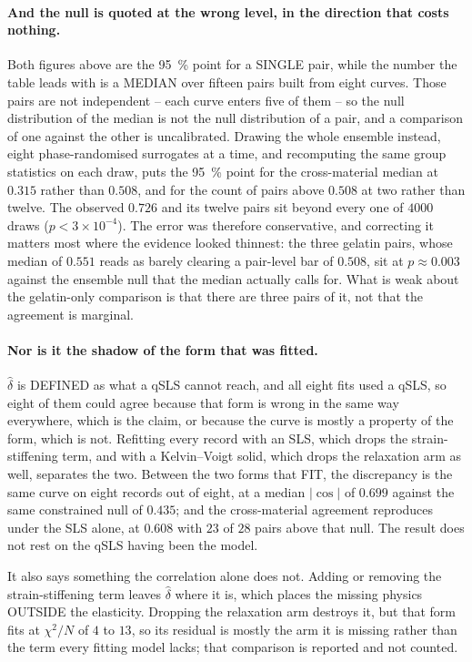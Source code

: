 \documentclass[10pt]{article}
\begin{document}
\paragraph{And the null is quoted at the wrong level, in the direction that costs nothing.}
Both figures above are the \SI{95}{\percent} point for a SINGLE pair, while the number the table
leads with is a MEDIAN over fifteen pairs built from eight curves. Those pairs are not
independent -- each curve enters five of them -- so the null distribution of the median is not
the null distribution of a pair, and a comparison of one against the other is uncalibrated.
Drawing the whole ensemble instead, eight phase-randomised surrogates at a time, and recomputing
the same group statistics on each draw, puts the \SI{95}{\percent} point for the cross-material
median at $0.315$ rather than $0.508$, and for the count of pairs above $0.508$ at two rather
than twelve. The observed $0.726$ and its twelve pairs sit beyond every one of $4000$ draws
($p < 3\times10^{-4}$). The error was therefore conservative, and correcting it matters most
where the evidence looked thinnest: the three gelatin pairs, whose median of $0.551$ reads as
barely clearing a pair-level bar of $0.508$, sit at $p \approx 0.003$ against the ensemble null
that the median actually calls for. What is weak about the gelatin-only comparison is that there
are three pairs of it, not that the agreement is marginal.

\paragraph{Nor is it the shadow of the form that was fitted.} $\hat\delta$ is DEFINED as what a
qSLS cannot reach, and all eight fits used a qSLS, so eight of them could agree because that form
is wrong in the same way everywhere, which is the claim, or because the curve is mostly a
property of the form, which is not. Refitting every record with an SLS, which drops the
strain-stiffening term, and with a Kelvin--Voigt solid, which drops the relaxation arm as well,
separates the two. Between the two forms that FIT, the discrepancy is the same curve on eight
records out of eight, at a median $\lvert\cos\rvert$ of $0.699$ against the same constrained null
of $0.435$; and the cross-material agreement reproduces under the SLS alone, at $0.608$ with
$23$ of $28$ pairs above that null. The result does not rest on the qSLS having been the model.

It also says something the correlation alone does not. Adding or removing the strain-stiffening
term leaves $\hat\delta$ where it is, which places the missing physics OUTSIDE the elasticity.
Dropping the relaxation arm destroys it, but that form fits at $\chi^2/N$ of $4$ to $13$, so its
residual is mostly the arm it is missing rather than the term every fitting model lacks; that
comparison is reported and not counted.
\end{document}
